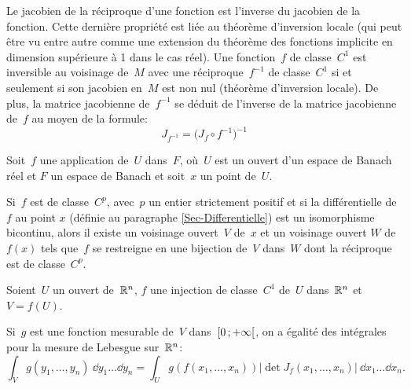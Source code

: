 \medskipvm
Le jacobien de la réciproque d'une fonction est l'inverse du jacobien de la fonction.
\medskipvm
{}
Cette dernière propriété est liée au théorème d'inversion locale (qui peut être vu entre autre comme une extension du théorème des fonctions implicite en dimension supérieure à 1 dans le cas réel).
\medskipvm
Une fonction~$f$ de classe~$C^1$ est inversible au voisinage de~$M$ avec une réciproque~$f^{-1}$ de classe~$C^1$ si et seulement si son jacobien en~$M$ est non nul (théorème d'inversion locale). De plus, la matrice jacobienne de~$f^{-1}$ se déduit de l'inverse de la matrice jacobienne de~$f$ au moyen de la formule:
\begin{equation}J_{f^{-1}} = \bigl( J_f \circ f^{-1} \bigr)^{-1}\end{equation}

\begin{theoreme}
Soit~$f$ une application de~$U$ dans~$F$, où~$U$ est un ouvert d'un espace de Banach réel et $F$ un espace de Banach et soit~$x$ un point de~$U$.

Si~$f$ est de classe~$C^p$, avec~$p$ un entier strictement positif et si la différentielle de~$f$ au point $x$ (définie au paragraphe \ref{Sec-Differentielle}) est un isomorphisme bicontinu, alors il existe un voisinage ouvert~$V$ de~$x$ et un voisinage ouvert $W$ de~$f(x)$ tels que~$f$ se restreigne en une bijection de~$V$ dans~$W$ dont la réciproque est de classe~$C^p$.
\end{theoreme}
\medskipvm
{}
\medskipvm
\begin{theoreme}
Soient~$U$ un ouvert de~$\mathbb R^n$, $f$ une injection de classe~$C^1$ de~$U$ dans~$\mathbb R^n$ et~$V=f(U)$.

Si~$g$ est une fonction mesurable de~$V$ dans~$\mathopen{[}0\,;+\infty\mathclose{[}$, on a égalité des intégrales pour la mesure de Lebesgue sur~$\mathbb R^n$:
\begin{equation}  \int_V g(y_1,\ldots,y_n)~\dd y_1\ldots\dd y_n = \int_U g\left(f\left(x_1,\ldots,x_n\right)\right) 
\left|\det J_f(x_1,\ldots,x_n)\right|~\dd x_1\ldots\dd x_n.
\end{equation}
\end{theoreme}
\medskipvm
{}

